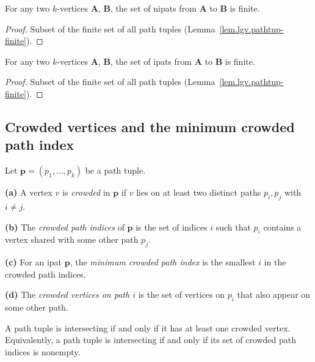 \begin{lemma}
\label{lem.lgv.nipats-finite}
\leanhelper
\leanok
For any two $k$-vertices $\mathbf{A}$, $\mathbf{B}$, the set of
nipats from $\mathbf{A}$ to $\mathbf{B}$ is finite.
\end{lemma}

\begin{proof}
\leanok
Subset of the finite set of all path tuples (Lemma~\ref{lem.lgv.pathtup-finite}).
\end{proof}

\begin{lemma}
\label{lem.lgv.ipats-finite}
\leanhelper
\leanok
For any two $k$-vertices $\mathbf{A}$, $\mathbf{B}$, the set of
ipats from $\mathbf{A}$ to $\mathbf{B}$ is finite.
\end{lemma}

\begin{proof}
\leanok
Subset of the finite set of all path tuples (Lemma~\ref{lem.lgv.pathtup-finite}).
\end{proof}

\subsection{Crowded vertices and the minimum crowded path index}

\begin{definition}
\label{def.lgv.crowded}
\leanhelper
\leanok
Let $\mathbf{p} = (p_1, \ldots, p_k)$ be a path tuple.

\textbf{(a)} A vertex $v$ is \emph{crowded} in $\mathbf{p}$ if $v$ lies on at least
two distinct paths $p_i, p_j$ with $i \ne j$.

\textbf{(b)} The \emph{crowded path indices} of $\mathbf{p}$ is the set of indices
$i$ such that $p_i$ contains a vertex shared with some other path $p_j$.

\textbf{(c)} For an ipat $\mathbf{p}$, the \emph{minimum crowded path index} is
the smallest $i$ in the crowded path indices.

\textbf{(d)} The \emph{crowded vertices on path $i$} is the set of vertices on
$p_i$ that also appear on some other path.
\end{definition}

\begin{lemma}
\label{lem.lgv.ipat-iff-crowded}
\leanhelper
\leanok
A path tuple is intersecting if and only if it has at least one crowded vertex.
Equivalently, a path tuple is intersecting if and only if its set of crowded
path indices is nonempty.
\end{lemma}

